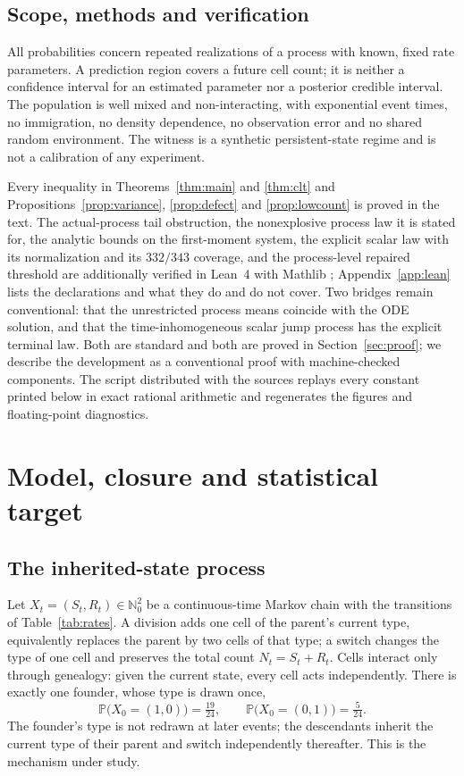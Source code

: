 \documentclass[11pt,a4paper]{article}
\theoremstyle{plain}
\theoremstyle{definition}
\theoremstyle{remark}
\newcommand{\N}{\mathbb N}
\newcommand{\PP}{\mathbb P}
\begin{document}
\subsection{Scope, methods and verification}
All probabilities concern repeated realizations of a process with known, fixed rate parameters. A prediction region covers a future cell count; it is neither a confidence interval for an estimated parameter nor a posterior credible interval. The population is well mixed and non-interacting, with exponential event times, no immigration, no density dependence, no observation error and no shared random environment. The witness is a synthetic persistent-state regime and is not a calibration of any experiment.

Every inequality in Theorems~\ref{thm:main} and \ref{thm:clt} and Propositions~\ref{prop:variance}, \ref{prop:defect} and \ref{prop:lowcount} is proved in the text. The actual-process tail obstruction, the nonexplosive process law it is stated for, the analytic bounds on the first-moment system, the explicit scalar law with its normalization and its $332/343$ coverage, and the process-level repaired threshold are additionally verified in Lean~4 with Mathlib \citep{demoura2021,mathlib2020}; Appendix~\ref{app:lean} lists the declarations and what they do and do not cover. Two bridges remain conventional: that the unrestricted process means coincide with the ODE solution, and that the time-inhomogeneous scalar jump process has the explicit terminal law. Both are standard and both are proved in Section~\ref{sec:proof}; we describe the development as a conventional proof with machine-checked components. The script  distributed with the sources replays every constant printed below in exact rational arithmetic and regenerates the figures and floating-point diagnostics.

\section{Model, closure and statistical target}\label{sec:model}

\subsection{The inherited-state process}
Let $X_t=(S_t,R_t)\in\N_0^2$ be a continuous-time Markov chain with the transitions of Table~\ref{tab:rates}. A division adds one cell of the parent's current type, equivalently replaces the parent by two cells of that type; a switch changes the type of one cell and preserves the total count $N_t=S_t+R_t$. Cells interact only through genealogy: given the current state, every cell acts independently. There is exactly one founder, whose type is drawn once,
\begin{equation}\label{eq:initial}
\PP\bigl(X_0=(1,0)\bigr)=\tfrac{19}{24},\qquad \PP\bigl(X_0=(0,1)\bigr)=\tfrac5{24}.
\end{equation}
The founder's type is not redrawn at later events; the descendants inherit the current type of their parent and switch independently thereafter. This is the mechanism under study.
\end{document}
